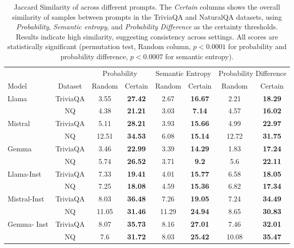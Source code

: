 \begin{table*}[t]
        \centering
        \begin{tabular}{l c cc cc cc}
        \toprule
        & & \multicolumn{2}{c}{Probability} & \multicolumn{2}{c}{Semantic Entropy} & \multicolumn{2}{c}{Probability Difference}\\ 
        \cmidrule(lr){3-4} \cmidrule(lr){5-6}\cmidrule(lr){7-8}
        Model&Dataset&\multicolumn{1}{c}{Random} & \multicolumn{1}{c}{Certain} & \multicolumn{1}{c}{Random} & \multicolumn{1}{c}{Certain}& \multicolumn{1}{c}{Random} & \multicolumn{1}{c}{Certain}\\
        \midrule 
\multirow{2}{*}{Llama}  &  TriviaQA  & 3.55 & \textbf{27.42} & 2.67 & \textbf{16.67} & 2.21 &\textbf{18.29}\\ 
 & NQ & 4.38 & \textbf{21.21} & 3.03 &  \textbf{7.14} &4.57 & \textbf{16.02}\\
\midrule
\multirow{2}{*}{Mistral}  &  TriviaQA  & 5.11 & \textbf{28.21} & 3.93 & \textbf{15.66} &  4.99 &\textbf{22.97}\\ 
 & NQ & 12.51 & \textbf{34.53} & 6.08 &  \textbf{15.14} &12.72 & \textbf{31.75}\\
\midrule  
\multirow{2}{*}{Gemma}  &  TriviaQA  & 3.46 & \textbf{22.99} & 3.39 & \textbf{14.29} & 1.83 &\textbf{17.24}\\ 
 & NQ & 5.74 & \textbf{26.52} & 3.71 &  \textbf{9.2} &5.6 & \textbf{22.11}\\
\midrule 
\multirow{2}{*}{Llama-Inst} &  TriviaQA  & 7.33 & \textbf{19.41} & 4.01 & \textbf{15.77}  & 6.58 &\textbf{18.05}\\ 
 & NQ & 7.25 & \textbf{18.08} & 4.59 &  \textbf{15.36} &6.82 & \textbf{17.34}\\
\midrule  
\multirow{2}{*}{Mistral-Inst} &  TriviaQA  & 8.03 & \textbf{36.48} & 7.26 & \textbf{19.05}& 7.24 &\textbf{34.49}\\ 
 & NQ & 11.05 & \textbf{31.46} & 11.29 &  \textbf{24.94} & 8.65 & \textbf{30.83}\\
\midrule  
\multirow{2}{*}{Gemma- Inst} &  TriviaQA  & 8.07 & \textbf{35.73} & 8.16 & \textbf{27.01} & 7.46 &\textbf{32.01}\\ 
 & NQ & 7.6 & \textbf{31.72} & 8.03 &  \textbf{25.42} &10.08 & \textbf{35.47}\\
\bottomrule
\end{tabular}
        \caption{Jaccard Similarity of \chk across different prompts. The \textit{Certain} columns shows the overall similarity of \emph{\chk} samples between prompts in the TriviaQA and NaturalQA datasets, using \emph{Probability}, \emph{Semantic entropy}, and \emph{Probability Difference} as the certainty thresholds. Results indicate high similarity, suggesting consistency across settings. All scores are statistically significant (permutation test, Random column, \(p < 0.0001\) for probability and probability difference,  \(p < 0.0007\) for semantic entropy).}
        \label{tab:jaccard}
\end{table*}





